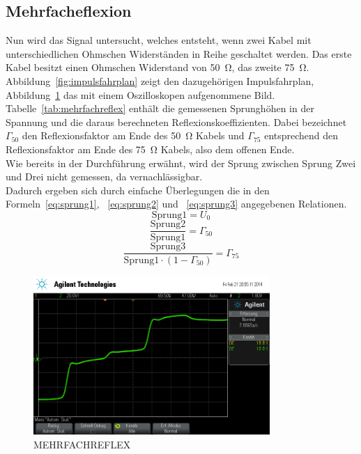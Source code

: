 \subsection{Mehrfacheflexion}
%
Nun wird das Signal untersucht, welches entsteht, wenn zwei 
Kabel mit unterschiedlichen Ohmschen Widerständen in Reihe geschaltet 
werden. Das erste Kabel besitzt einen Ohmschen Widerstand von 
\SI{50}{\ohm}, das zweite \SI{75}{\ohm}.\\
Abbildung~\ref{fig:impulsfahrplan} zeigt den dazugehörigen 
Impulsfahrplan, Abbildung~\ref{fig:mehrfachreflex} das mit einem 
Oszilloskopen aufgenommene Bild.\\
Tabelle~\ref{tab:mehrfachreflex} enthält die gemessenen Sprunghöhen 
in der Spannung und die daraus berechneten Reflexionskoeffizienten. 
Dabei bezeichnet $\Gamma_{50}$ den Reflexionsfaktor am Ende des 
\SI{50}{\ohm} Kabels und $\Gamma_{75}$ entsprechend den 
Reflexionsfaktor am Ende des \SI{75}{\ohm} Kabels, also dem offenen 
Ende.\\
Wie bereits in der Durchführung erwähnt, wird der Sprung zwischen 
Sprung Zwei und Drei nicht gemessen, da vernachlässigbar.\\
Dadurch ergeben sich durch einfache Überlegungen die in 
den Formeln~\eqref{eq:sprung1}, ~\eqref{eq:sprung2} 
und ~\eqref{eq:sprung3} angegebenen Relationen.
%
\begin{equation}
\text{Sprung1} = U_0
\end{equation}
%
\begin{equation}
\frac{\text{Sprung2}}{\text{Sprung1}} = \Gamma_{50}
\end{equation}
%
\begin{equation}
\frac{\text{Sprung3}}{\text{Sprung1}\cdot\left(1 - \Gamma_{50}\right)} = \Gamma_{75}
\end{equation}
%
\begin{figure}[]
\centering
\includegraphics[width=0.8\textwidth]{reflex.png}
\caption{MEHRFACHREFLEX}
\label{fig:mehrfachreflex}
\end{figure}
